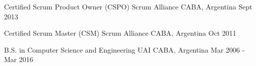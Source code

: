 
\begin{cventries}
  \cventry
    {Certified Scrum Product Owner (CSPO)} %
    {Scrum Alliance} %
    {CABA, Argentina} %
    {Sept 2013} %
    {}

  \cventry
    {Certified Scrum Master (CSM)} %
    {Scrum Alliance} %
    {CABA, Argentina} %
    {Oct 2011} %
    {}

  \cventry
    {B.S. in Computer Science and Engineering} %
    {UAI} %
    {CABA, Argentina} %
    {Mar 2006 - Mar 2016} %
    {}
\end{cventries}

